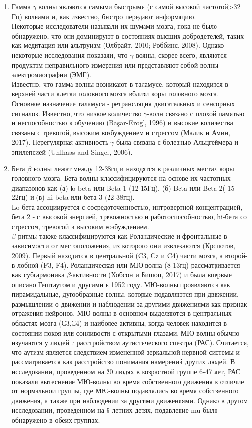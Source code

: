 \documentclass[12pt, a4paper, titlepage]{extreport}
\begin{document}
	\begin{enumerate}
		\item Гамма $\gamma$ волны являются самыми быстрыми (с самой высокой частотой>32 Гц) волнами и, как известно, быстро передают информацию.\\
		Некоторые исследователи называли их шумами мозга, пока не было обнаружено, что они доминируют в состояниях высших добродетелей, таких как медитация или альтруизм (Олбрайт, 2010; Роббинс, 2008). Однако некоторые исследования показали, что $\gamma$-волны, скорее всего, являются продуктом неправильного измерения или представляют собой волны электромиографии (ЭМГ).\\
		Известно, что гамма-волны возникают в таламусе, который находится в верхней части клетки головного мозга вблизи коры головного мозга. Основное назначение таламуса - ретрансляция двигательных и сенсорных сигналов. Известно, что низкое количество $\gamma$-волн связано с плохой памятью и неспособностью к обучению (Başar-Erogl, 1996) и высокие количества связаны с тревогой, высоким возбуждением и стрессом (Малик и Амин, 2017). Нерегулярная активность $\gamma$ была связана с болезнью Альцгеймера и эпилепсией (Uhlhaas and Singer, 2006).
		
		\item Бета $\beta$ волны лежат между 12-38гц и находятся в различных местах коры головного мозга. Бета-волны классифицируются на основе их частотных диапазонов как (а) lo beta или Beta 1 (12-15Гц), (б) Beta или Beta 2( 15-22гц) и (в) hi-beta
		или бета-3 (22-38гц).\\
		Lo-бета ассоциируется с сосредоточенностью, интровертной концентрацией, бета 2 - с высокой энергией, тревожностью и работоспособностью, hi-бета со стрессом, тревогой и высоким возбуждением.\\
		$\beta$-ритмы также классифицируются как Роландические и фронтальные в зависимости от местоположения, из которого они извлекаются (Кропотов, 2009). Первый находится в центральной (C3, Cz и C4) части мозга, а второй-в лобной (F3, F4).
		Роландическая или МЮ-волна (8-13гц) рассматривается как субгармоника $\beta$-активности (Хобсон и Бишоп, 2017) и была
		впервые описано Гештаутом и другими в 1952 году. МЮ-волны проявляются как пирамидальные, дугообразные волны, которые подавляются при движении, размышлении о движении и наблюдении за другими движениями как признак отражения нейронов. МЮ-волны в основном выделяются в центральных областях мозга (С3,С4) и наиболее активны, когда человек находится в состоянии покоя или сонливости с открытыми глазами. МЮ-волны обычно изучаются у людей с расстройством аутистического спектра (РАС). Считается, что аутизм является следствием измененной зеркальной нервной системы и рассматривается как расстройство понимания намерений других людей. В исследовании, проведенном на 20 людях в возрастной группе 6-47 лет, РАС показали вытеснение МЮ-волны во время собственного движения в отличие от нормальной группы, где МЮ-волны подавлялись во время собственного движения, а также при наблюдении за другими движениями. Однако в другом исследовании, проведенном на 6-летних детях, подавление mu было обнаружено в обеих группах.
		

\end{enumerate}
\end{document}
